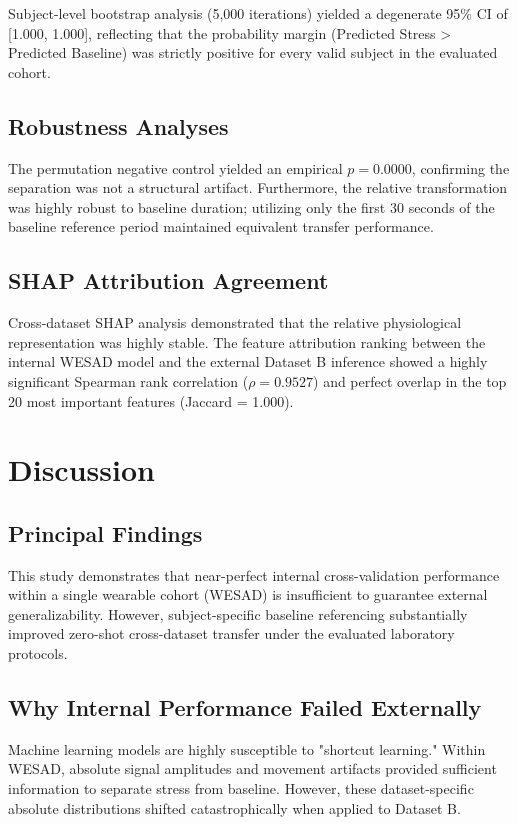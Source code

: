 \documentclass[journal]{IEEEtran}
\begin{document}
Subject-level bootstrap analysis (5,000 iterations) yielded a degenerate 95\% CI of [1.000, 1.000], reflecting that the probability margin (Predicted Stress > Predicted Baseline) was strictly positive for every valid subject in the evaluated cohort. 

\subsection{Robustness Analyses}
The permutation negative control yielded an empirical $p = 0.0000$, confirming the separation was not a structural artifact. Furthermore, the relative transformation was highly robust to baseline duration; utilizing only the first 30 seconds of the baseline reference period maintained equivalent transfer performance. 

\subsection{SHAP Attribution Agreement}
Cross-dataset SHAP analysis demonstrated that the relative physiological representation was highly stable. The feature attribution ranking between the internal WESAD model and the external Dataset B inference showed a highly significant Spearman rank correlation ($\rho = 0.9527$) and perfect overlap in the top 20 most important features (Jaccard = 1.000). 

\section{Discussion}

\subsection{Principal Findings}
This study demonstrates that near-perfect internal cross-validation performance within a single wearable cohort (WESAD) is insufficient to guarantee external generalizability. However, subject-specific baseline referencing substantially improved zero-shot cross-dataset transfer under the evaluated laboratory protocols.

\subsection{Why Internal Performance Failed Externally}
Machine learning models are highly susceptible to "shortcut learning." Within WESAD, absolute signal amplitudes and movement artifacts provided sufficient information to separate stress from baseline. However, these dataset-specific absolute distributions shifted catastrophically when applied to Dataset B.
\end{document}
